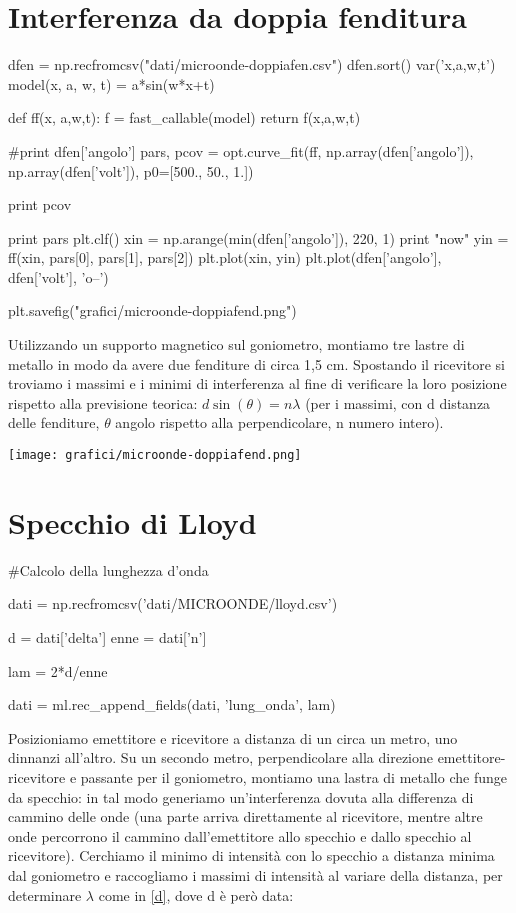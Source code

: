 \section{Interferenza da doppia fenditura}
\begin{sagesilent}
dfen = np.recfromcsv("dati/microonde-doppiafen.csv")
dfen.sort()
var('x,a,w,t')
model(x, a, w, t) = a*sin(w*x+t)

def ff(x, a,w,t):
  f = fast_callable(model)
  return f(x,a,w,t)

#print dfen['angolo']
pars, pcov = opt.curve_fit(ff, np.array(dfen['angolo']), np.array(dfen['volt']), p0=[500., 50., 1.])

print pcov

print pars
plt.clf()
xin = np.arange(min(dfen['angolo']), 220, 1)
print "now"
yin = ff(xin, pars[0], pars[1], pars[2])
plt.plot(xin, yin)
plt.plot(dfen['angolo'], dfen['volt'], 'o--')

plt.savefig("grafici/microonde-doppiafend.png")
\end{sagesilent}


Utilizzando un supporto magnetico sul goniometro, montiamo tre lastre di metallo in modo da avere due
fenditure di circa 1,5 cm. Spostando il ricevitore si troviamo i massimi e i minimi di interferenza al fine di verificare la
loro posizione rispetto alla previsione teorica: $d \sin(\theta) = n \lambda$ (per i massimi, con d distanza delle fenditure, $\theta$ angolo
rispetto alla perpendicolare, n numero intero).

\texttt{[image: grafici/microonde-doppiafend.png]}

\section{Specchio di Lloyd}

\begin{sagesilent}
#Calcolo della lunghezza d'onda

dati = np.recfromcsv('dati/MICROONDE/lloyd.csv')

d = dati['delta']
enne = dati['n']

lam = 2*d/enne


dati = ml.rec_append_fields(dati, 'lung_onda', lam)

\end{sagesilent}

Posizioniamo emettitore e ricevitore a distanza di un circa un metro, uno dinnanzi all'altro. Su un secondo metro, perpendicolare alla direzione emettitore-ricevitore e passante per il goniometro, montiamo una lastra di metallo che funge da specchio: in tal modo generiamo un'interferenza dovuta alla differenza di cammino delle onde (una parte arriva direttamente al ricevitore, mentre altre onde percorrono il cammino dall'emettitore allo specchio e dallo specchio al ricevitore). Cerchiamo il minimo di intensità con lo specchio a distanza minima dal goniometro e raccogliamo i massimi di intensità al variare della distanza, per determinare $\lambda$ come in \ref{d}, dove d è però data:

